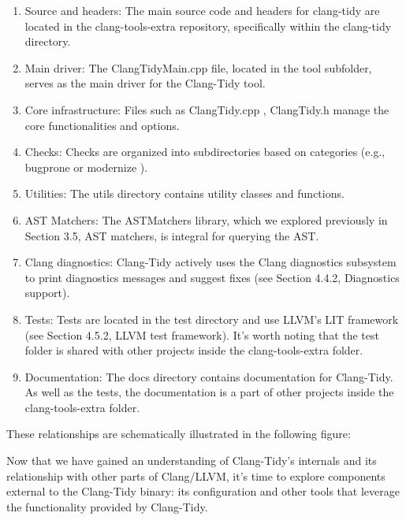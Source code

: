 \begin{enumerate}
\item
Source and headers: The main source code and headers for clang-tidy are located in the clang-tools-extra repository, specifically within the clang-tidy directory.

\item
Main driver: The ClangTidyMain.cpp file, located in the tool subfolder, serves as the main driver for the Clang-Tidy tool.

\item
Core infrastructure: Files such as ClangTidy.cpp , ClangTidy.h manage the core functionalities and options.

\item
Checks: Checks are organized into subdirectories based on categories (e.g., bugprone or modernize ).

\item
Utilities: The utils directory contains utility classes and functions.

\item
AST Matchers: The ASTMatchers library, which we explored previously in Section 3.5, AST matchers, is integral for querying the AST.

\item
Clang diagnostics: Clang-Tidy actively uses the Clang diagnostics subsystem to print diagnostics messages and suggest fixes (see Section 4.4.2, Diagnostics support).

\item
Tests: Tests are located in the test directory and use LLVM's LIT framework (see Section 4.5.2, LLVM test framework). It's worth noting that the test folder is shared with other projects inside the clang-tools-extra folder.

\item
Documentation: The docs directory contains documentation for Clang-Tidy. As well as the tests, the documentation is a part of other projects inside the clang-tools-extra folder.
\end{enumerate}

These relationships are schematically illustrated in the following figure:


Now that we have gained an understanding of Clang-Tidy's internals and its relationship with other parts of Clang/LLVM, it's time to explore components external to the Clang-Tidy binary: its configuration and other tools that leverage the functionality provided by Clang-Tidy.

